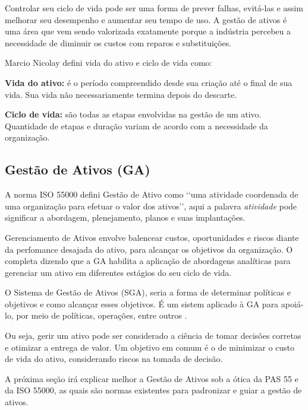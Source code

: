 Controlar seu ciclo de vida pode ser uma forma de prever falhas, evitá-las e assim melhorar seu desempenho e aumentar seu tempo de uso. A gestão de ativos é uma área que vem sendo valorizada exatamente porque a indústria percebeu a necessidade de diminuir os custos com reparos e substituições.

Marcio Nicolay \cite{nicolay2015} defini vida do ativo e ciclo de vida como:

\textbf{Vida do ativo:} é o período compreendido desde sua criação até o final de sua vida. Sua vida não necessariamente termina depois do descarte.

\textbf{Ciclo de vida:} são todas as etapas envolvidas na gestão de um ativo. Quantidade de etapas e duração variam de acordo com a necessidade da organização.


\subsection{Gestão de Ativos (GA)}

A norma ISO 55000 defini Gestão de Ativo como \lq\lq uma atividade coordenada de uma organização para efetuar o valor dos ativos\rq\rq, aqui a palavra \emph{atividade} pode significar a abordagem, plenejamento, planos e suas implantações. 

Gerenciamento de Ativos envolve balencear custos, oportunidades e riscos diante da perfomance desajada do ativo, para alcançar os objetivos da organização. O \cite{iam} completa dizendo que a GA habilita a aplicação de abordagens analíticas para gerenciar um ativo em diferentes estágios do seu ciclo de vida.

O Sistema de Gestão de Ativos (SGA), seria a forma de determinar políticas e objetivos e como alcançar esses objetivos. É um sistem aplicado à GA para apoiá-lo, por meio de políticas, operações, entre outros \cite{abraman}. 

Ou seja, gerir um ativo pode ser considerado a ciência de tomar decisões corretas e otimizar a entrega de valor. Um objetivo em comum é o de minimizar o custo de vida do ativo, considerando riscos na tomada de decisão.

A próxima seção irá explicar melhor a Gestão de Ativos sob a ótica da PAS 55 e da ISO 55000, as quais são normas existentes para padronizar e guiar a gestão de ativos.


